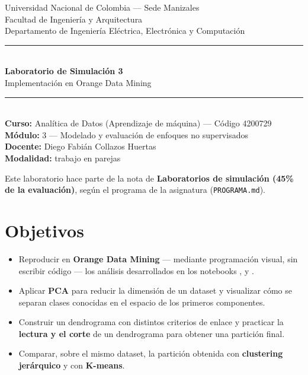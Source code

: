 \documentclass[11pt,letterpaper]{article}
\title{\vspace{-2cm}}
\date{}
\begin{document}
\begin{titlepage}
\centering
\vspace*{1.5cm}

{\Large Universidad Nacional de Colombia --- Sede Manizales}\\[0.2cm]
{\large Facultad de Ingeniería y Arquitectura}\\[0.2cm]
{\large Departamento de Ingeniería Eléctrica, Electrónica y Computación}\\[1.2cm]

\rule{\linewidth}{1pt}\\[0.5cm]
{\huge\bfseries\color{brandblue} Laboratorio de Simulación 3}\\[0.4cm]
{\Large Implementación en Orange Data Mining}\\[0.5cm]
\rule{\linewidth}{1pt}\\[1cm]

{\large \textbf{Curso:} Analítica de Datos (Aprendizaje de máquina) --- Código 4200729}\\[0.3cm]
{\large \textbf{Módulo:} 3 --- Modelado y evaluación de enfoques no supervisados}\\[0.3cm]
{\large \textbf{Docente:} Diego Fabián Collazos Huertas}\\[0.3cm]
{\large \textbf{Modalidad:} trabajo en parejas}\\[1.5cm]

\vfill

{\small Este laboratorio hace parte de la nota de \textbf{Laboratorios de simulación (45\% de la evaluación)}, según el programa de la asignatura (\texttt{PROGRAMA.md}).}

\end{titlepage}

\section{Objetivos}

\begin{itemize}[leftmargin=1.2cm]
  \item Reproducir en \textbf{Orange Data Mining} --- mediante programación visual, sin escribir código --- los análisis desarrollados en los notebooks \texttt{}, \texttt{} y \texttt{}.
  \item Aplicar \textbf{PCA} para reducir la dimensión de un dataset y visualizar cómo se separan clases conocidas en el espacio de los primeros componentes.
  \item Construir un dendrograma con distintos criterios de enlace y practicar la \textbf{lectura y el corte} de un dendrograma para obtener una partición final.
  \item Comparar, sobre el mismo dataset, la partición obtenida con \textbf{clustering jerárquico} y con \textbf{K-means}.
\end{itemize}
\end{document}
